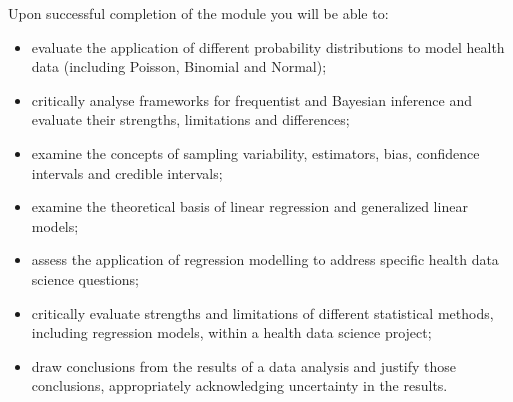 \documentclass[letterpaper,10pt,english]{jupyterBook}
\begin{document}
\sphinxAtStartPar
Upon successful completion of the module you will be able to:
\begin{itemize}
\item {} 
\sphinxAtStartPar
evaluate the application of different probability distributions to model health data (including Poisson, Binomial and Normal);

\item {} 
\sphinxAtStartPar
critically analyse frameworks for frequentist and Bayesian inference and evaluate their strengths, limitations and differences;

\item {} 
\sphinxAtStartPar
examine the concepts of sampling variability, estimators, bias, confidence intervals and credible intervals;

\item {} 
\sphinxAtStartPar
examine the theoretical basis of linear regression and generalized linear models;

\item {} 
\sphinxAtStartPar
assess the application of regression modelling to address specific health data science questions;

\item {} 
\sphinxAtStartPar
critically evaluate strengths and limitations of different statistical methods, including regression models, within a health data science project;

\item {} 
\sphinxAtStartPar
draw conclusions from the results of a data analysis and justify those conclusions, appropriately acknowledging uncertainty in the results.

\end{itemize}



\begin{DUlineblock}{0em}
\item[] 
\end{DUlineblock}
\end{document}
